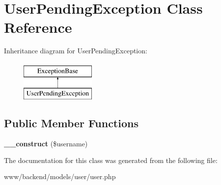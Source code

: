 \hypertarget{classUserPendingException}{
\section{UserPendingException Class Reference}
\label{classUserPendingException}
}
Inheritance diagram for UserPendingException:\begin{figure}[H]
\begin{center}
\leavevmode
\includegraphics[height=2.000000cm]{classUserPendingException}
\end{center}
\end{figure}
\subsection*{Public Member Functions}
\begin{DoxyCompactItemize}
\item 
\hypertarget{classUserPendingException_a8fb64905027517ddd3ab24d35d25c3ec}{
{\bfseries \_\-\_\-construct} (\$username)}
\label{classUserPendingException_a8fb64905027517ddd3ab24d35d25c3ec}

\end{DoxyCompactItemize}


The documentation for this class was generated from the following file:\begin{DoxyCompactItemize}
\item 
www/backend/models/user/user.php\end{DoxyCompactItemize}
